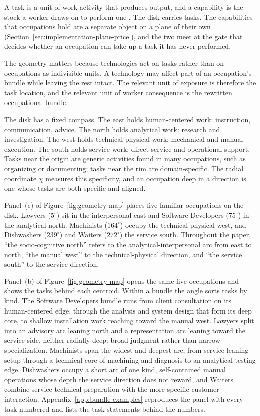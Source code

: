 \documentclass[12pt, a4paper]{article}
\begin{document}
A task is a unit of work activity that produces output, and a capability
is the stock a worker draws on to perform one \parencite{autor2013a}.
The disk carries tasks. The capabilities that occupations hold are a
separate object on a plane of their own
(Section~\ref{sec:implementation-plane-price}), and the two meet at the
gate that decides whether an occupation can take up a task it has never
performed.

The geometry matters because technologies act on tasks rather than on
occupations as indivisible units. A technology may affect part of an
occupation's bundle while leaving the rest intact. The relevant unit of
exposure is therefore the task location, and the relevant unit of
worker consequence is the rewritten occupational bundle.

The disk has a fixed compass. The east holds human-centered work:
instruction, communication, advice. The north holds analytical work:
research and investigation. The west holds technical-physical work:
mechanical and manual execution. The south holds service work: direct
service and operational support. Tasks near the origin are generic
activities found in many occupations, such as organizing or
documenting; tasks near the rim are domain-specific. The radial
coordinate $\chi$ measures this specificity, and an occupation deep in
a direction is one whose tasks are both specific and aligned.

Panel~(c) of Figure~\ref{fig:geometry-map} places five familiar
occupations on the disk. Lawyers ($5^\circ$) sit in the interpersonal
east and Software Developers ($75^\circ$) in the analytical north.
Machinists ($164^\circ$) occupy the technical-physical west, and
Dishwashers ($239^\circ$) and Waiters ($272^\circ$) the service south.
Throughout the paper, ``the socio-cognitive
north'' refers to the analytical-interpersonal arc from east to north,
``the manual west'' to the technical-physical direction, and ``the
service south'' to the service direction.

Panel~(b) of Figure~\ref{fig:geometry-map} opens the same five
occupations and shows the tasks behind each centroid. Within a bundle
the angle sorts tasks by kind. The Software Developers bundle runs from
client consultation on its human-centered edge, through the analysis
and system design that form its deep core, to shallow installation work
reaching toward the manual west. Lawyers split into an advisory arc
leaning north and a representation arc leaning toward the service side,
neither radially deep: broad judgment rather than narrow
specialization. Machinists span the widest and deepest arc, from
service-leaning setup through a technical core of machining and
diagnosis to an analytical testing edge. Dishwashers occupy a short arc
of one kind, self-contained manual operations whose depth the service
direction does not reward, and Waiters combine service-technical
preparation with the more specific customer interaction.
Appendix~\ref{app:bundle-examples} reproduces the panel with every task
numbered and lists the task statements behind the numbers.
\end{document}
